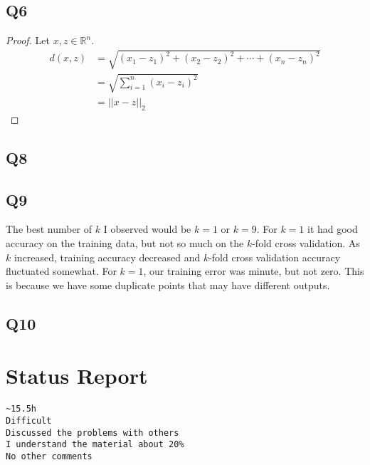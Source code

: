 \documentclass{article}
\theoremstyle{definition}
\begin{document}
    \subsection{Q6}
        \begin{proof}
            Let $x, z \in \mathbb{R}^n$.
            \begin{align*}
                d(x, z) &= \sqrt{(x_1 - z_1)^2 + (x_2 - z_2)^2 + \cdots + (x_n - z_n)^2} \\
                &= \sqrt{\sum_{i = 1}^n (x_i - z_i)^2} \\
                &= ||x - z||_2
            \end{align*}
        \end{proof}
    \subsection{Q8}
    \subsection{Q9}
        The best number of $k$ I observed would be $k=1$ or $k=9$. For $k=1$ it had good accuracy on the training data, but 
        not so much on the $k$-fold cross validation. As $k$ increased, training accuracy decreased and $k$-fold cross validation
        accuracy fluctuated somewhat. For $k = 1$, our training error was minute, but not zero. This is because we have some duplicate points
        that may have different outputs.
    \subsection{Q10}
\section{Status Report}
\begin{verbatim}
~15.5h
Difficult
Discussed the problems with others
I understand the material about 20%
No other comments
\end{verbatim}
\end{document}
